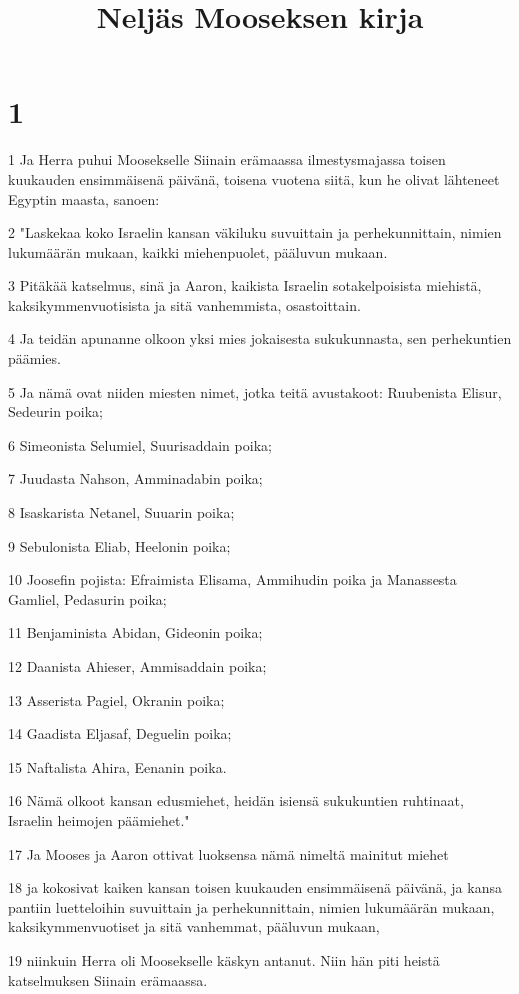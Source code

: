 

\title{Neljäs Mooseksen kirja}


\chapter{1}

\par 1 Ja Herra puhui Moosekselle Siinain erämaassa ilmestysmajassa toisen kuukauden ensimmäisenä päivänä, toisena vuotena siitä, kun he olivat lähteneet Egyptin maasta, sanoen:
\par 2 "Laskekaa koko Israelin kansan väkiluku suvuittain ja perhekunnittain, nimien lukumäärän mukaan, kaikki miehenpuolet, pääluvun mukaan.
\par 3 Pitäkää katselmus, sinä ja Aaron, kaikista Israelin sotakelpoisista miehistä, kaksikymmenvuotisista ja sitä vanhemmista, osastoittain.
\par 4 Ja teidän apunanne olkoon yksi mies jokaisesta sukukunnasta, sen perhekuntien päämies.
\par 5 Ja nämä ovat niiden miesten nimet, jotka teitä avustakoot: Ruubenista Elisur, Sedeurin poika;
\par 6 Simeonista Selumiel, Suurisaddain poika;
\par 7 Juudasta Nahson, Amminadabin poika;
\par 8 Isaskarista Netanel, Suuarin poika;
\par 9 Sebulonista Eliab, Heelonin poika;
\par 10 Joosefin pojista: Efraimista Elisama, Ammihudin poika ja Manassesta Gamliel, Pedasurin poika;
\par 11 Benjaminista Abidan, Gideonin poika;
\par 12 Daanista Ahieser, Ammisaddain poika;
\par 13 Asserista Pagiel, Okranin poika;
\par 14 Gaadista Eljasaf, Deguelin poika;
\par 15 Naftalista Ahira, Eenanin poika.
\par 16 Nämä olkoot kansan edusmiehet, heidän isiensä sukukuntien ruhtinaat, Israelin heimojen päämiehet."
\par 17 Ja Mooses ja Aaron ottivat luoksensa nämä nimeltä mainitut miehet
\par 18 ja kokosivat kaiken kansan toisen kuukauden ensimmäisenä päivänä, ja kansa pantiin luetteloihin suvuittain ja perhekunnittain, nimien lukumäärän mukaan, kaksikymmenvuotiset ja sitä vanhemmat, pääluvun mukaan,
\par 19 niinkuin Herra oli Moosekselle käskyn antanut. Niin hän piti heistä katselmuksen Siinain erämaassa.
